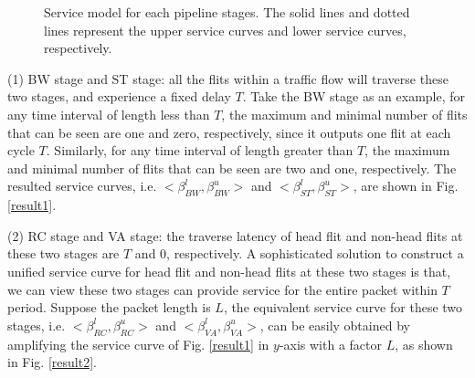 \documentclass[10pt,journal]{IEEEtran}
\begin{document}
\begin{figure}
  \caption{Service model for each pipeline stages. The solid lines and dotted lines represent the upper service curves and lower service curves, respectively.}
\end{figure}

(1) BW stage and ST stage: all the flits within a traffic flow will traverse these two stages, and experience a fixed delay $T$. Take the BW stage as an example, for any time interval of length less than $T$, the maximum and minimal number of flits that can be seen are one and zero, respectively, since it outputs one flit at each cycle $T$. Similarly, for any time interval of length greater than $T$, the maximum and minimal number of flits that can be seen are two and one, respectively. The resulted service curves, i.e. $<\beta^l_{BW},\beta^u_{BW}>$ and $<\beta^l_{ST},\beta^u_{ST}>$, are shown in Fig. \ref{result1}.

(2) RC stage and VA stage: the traverse latency of head flit and non-head flits at these two stages are $T$ and 0, respectively. A sophisticated solution to construct a unified service curve for head flit and non-head flits at these two stages is that, we can view these two stages can provide service for the entire packet within $T$ period. Suppose the packet length is $L$, the equivalent service curve for these two stages, i.e. $<\beta^l_{RC},\beta^u_{RC}>$ and $<\beta^l_{VA},\beta^u_{VA}>$, can be easily obtained by amplifying the service curve of Fig. \ref{result1} in $y$-axis with a factor $L$, as shown in Fig. \ref{result2}.
\end{document}
